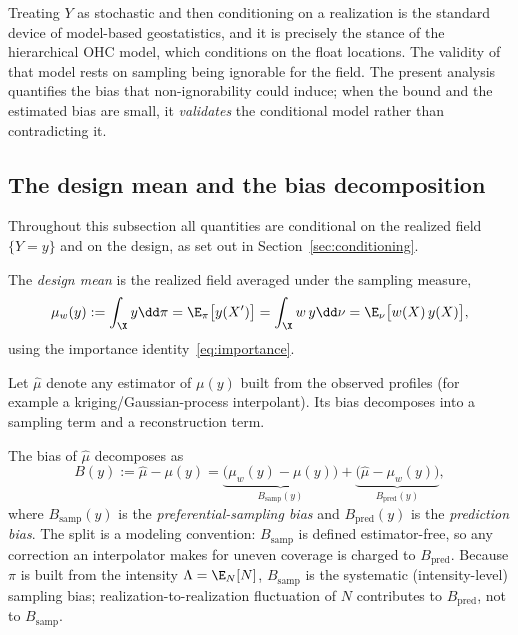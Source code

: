 \begin{remark}
\label{rem:coherence}
Treating $Y$ as stochastic and then conditioning on a realization is
the standard device of model-based geostatistics, and it is precisely
the stance of the hierarchical OHC model, which conditions on the float
locations. The validity of that model rests on sampling being
ignorable for the field. The present analysis quantifies the bias that
non-ignorability could induce; when the bound and the estimated bias
are small, it \emph{validates} the conditional model rather than
contradicting it.
\end{remark}

\subsection{The design mean and the bias decomposition}
\label{sec:bias-decomp}

Throughout this subsection all quantities are conditional on the
realized field $\{Y=y\}$ and on the design, as set out in
Section~\ref{sec:conditioning}.

\begin{definition}
\label{def:mu-w}
The \emph{design mean} is the realized field averaged under the
sampling measure,
\[
  \mu_w(y) := \int_\X y \dd\pi = \E_\pi\big[y(X')\big]
  = \int_\X w\,y \dd\nu = \E_\nu\big[w(X)\,y(X)\big],
\]
using the importance identity~\eqref{eq:importance}.
\end{definition}

Let $\hat\mu$ denote any estimator of $\mu(y)$ built from the observed
profiles (for example a kriging/Gaussian-process interpolant). Its bias
decomposes into a sampling term and a reconstruction term.

\begin{definition}
\label{def:bias}
The bias of $\hat\mu$ decomposes as
\[
  B(y) := \hat\mu - \mu(y)
  = \underbrace{\big(\mu_w(y) - \mu(y)\big)}_{\textstyle B_{\mathrm{samp}}(y)}
  + \underbrace{\big(\hat\mu - \mu_w(y)\big)}_{\textstyle B_{\mathrm{pred}}(y)},
\]
where $B_{\mathrm{samp}}(y)$ is the \emph{preferential-sampling bias}
and $B_{\mathrm{pred}}(y)$ is the \emph{prediction bias}. The split is a
modeling convention: $B_{\mathrm{samp}}$ is defined estimator-free, so
any correction an interpolator makes for uneven coverage is charged to
$B_{\mathrm{pred}}$. Because $\pi$ is built from the intensity
$\Lambda=\E_N[N]$, $B_{\mathrm{samp}}$ is the systematic
(intensity-level) sampling bias; realization-to-realization fluctuation
of $N$ contributes to $B_{\mathrm{pred}}$, not to $B_{\mathrm{samp}}$.
\end{definition}

